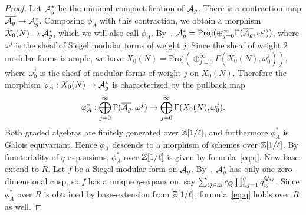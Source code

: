 \documentclass{amsart}
\begin{document}
\begin{proof}
    Let ${\mathcal{A}_{g}^\ast}$ be the minimal compactification of $\mathcal{A}_g$. There is a contraction map $\overline{\mathcal{A}_g} \to {\mathcal{A}_{g}^\ast}$. Composing $\phi_A$ with this contraction, we obtain a morphism $X_0(N) \to {\mathcal{A}_{g}^\ast}$, which we will also call $\phi_A$. By~\cite[Theorem V.2.3]{faltings1990degeneration}, ${\mathcal{A}_{g}^\ast} = \textrm{Proj}(\oplus_{j=0}^\infty \Gamma(\overline{\mathcal{A}_g}, \omega^j))$, where $\omega^j$ is the sheaf of Siegel modular forms of weight $j$. Since %
    the sheaf of weight $2$ modular forms is ample, we have $X_0(N) = \textrm{Proj}(\oplus_{j=0}^\infty \Gamma(X_0(N), \omega_0^j))$, where $\omega_0^j$ is the sheaf of modular forms of weight $j$ on $X_0(N)$. Therefore the morphism $\varphi_A: X_0(N) \to {\mathcal{A}_{g}^\ast}$ is characterized by the pullback map
    \[
      \varphi_A^*: \bigoplus_{j=0}^\infty \Gamma(\overline{\mathcal{A}_g}, \omega^j) \to \bigoplus_{j=0}^\infty \Gamma(X_0(N), \omega_0^j).
    \]
    Both graded algebras are finitely generated over $\mathbb{Z}[1/\ell]$, and furthermore $\phi_A^\ast$ is Galois equivariant. Hence $\phi_A$ descends to a morphism of schemes over $\mathbb{Z}[1/\ell]$. By functoriality of $q$-expansions, $\phi_A^*$ over $\mathbb{Z}[1/\ell]$ is given by formula~\eqref{eq:q}. Now base-extend to $R$. Let $f$ be a Siegel modular form on $\mathcal{A}_g$. By~\cite[Theorem V.2.3]{faltings1990degeneration}, ${\mathcal{A}_{g}^\ast}$ has only one zero-dimensional cusp, so $f$ has a unique $q$-expansion, say $\sum_{Q \in \mathscr{Q}} c_Q \prod_{i,j=1}^g q_{ij}^{Q_{ij}}$. Since $\phi_A^*$ over $R$ is obtained by base-extension from $\mathbb{Z}[1/\ell]$, formula~\eqref{eq:q} holds over $R$ as well.

\end{proof}
\end{document}
